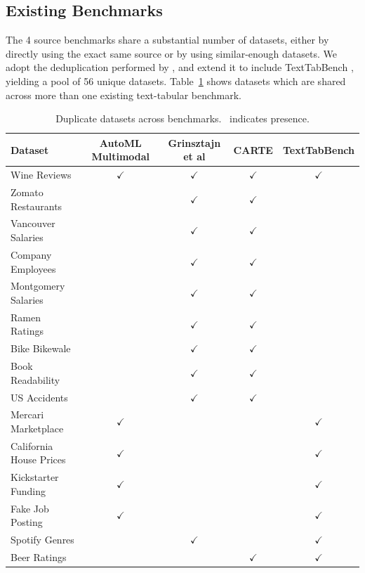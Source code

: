 \documentclass{llmxive}
\begin{document}
\subsection{Existing Benchmarks}

The 4 source benchmarks share a substantial number of datasets, either by directly using the exact same source or by using similar-enough datasets. We adopt the deduplication performed by \citet{arazi_tabstar_2025}, and extend it to include TextTabBench \cite{mraz_towards_2025}, yielding a pool of 56 unique datasets. Table~\ref{tab:text_deduplication} shows datasets which are shared across more than one existing text-tabular benchmark.


\begin{table}[ht]
\centering
\small
\begin{tabular}{lcccc}
\toprule
\textbf{Dataset} & \textbf{AutoML Multimodal} & \textbf{Grinsztajn et al} & \textbf{CARTE} & \textbf{TextTabBench} \\
\midrule
Wine Reviews           & $\checkmark$ & $\checkmark$ & $\checkmark$ & $\checkmark$ \\
Zomato Restaurants     &              & $\checkmark$ & $\checkmark$ &              \\
Vancouver Salaries     &              & $\checkmark$ & $\checkmark$ &              \\
Company Employees      &              & $\checkmark$ & $\checkmark$ &              \\
Montgomery Salaries    &              & $\checkmark$ & $\checkmark$ &              \\
Ramen Ratings          &              & $\checkmark$ & $\checkmark$ &              \\
Bike Bikewale          &              & $\checkmark$ & $\checkmark$ &              \\
Book Readability       &              & $\checkmark$ & $\checkmark$ &              \\
US Accidents           &              & $\checkmark$ & $\checkmark$ &              \\
Mercari Marketplace    & $\checkmark$ &              &              & $\checkmark$ \\
California House Prices & $\checkmark$ &              &              & $\checkmark$ \\
Kickstarter Funding    & $\checkmark$ &              &              & $\checkmark$ \\
Fake Job Posting       & $\checkmark$ &              &              & $\checkmark$ \\
Spotify Genres         &              & $\checkmark$ &              & $\checkmark$ \\
Beer Ratings           &              &              & $\checkmark$ & $\checkmark$ \\
\bottomrule
\end{tabular}
\caption{Duplicate datasets across benchmarks. \checkmark\ indicates presence.}
\label{tab:text_deduplication}
\end{table}
\end{document}
